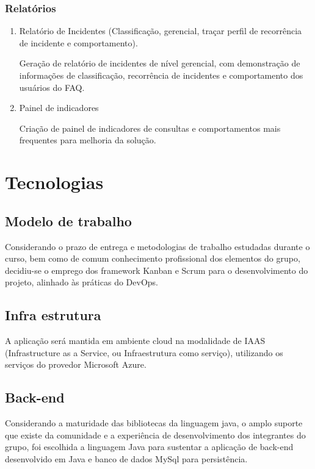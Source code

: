 \documentclass[
    12pt,               %
    openright,          %
    oneside,
    a4paper,            %
    MODELO,             %
    english,            %
    brazil              %
   ]{ifsp-spo-inf-ctds}
\begin{document}
\subsection{Relatórios}

	\begin{enumerate}

	\item Relatório de Incidentes (Classificação, gerencial, traçar perfil de recorrência de incidente e comportamento).
	
	Geração de relatório de incidentes de nível gerencial, com demonstração de informações de classificação, recorrência de incidentes e comportamento dos usuários do FAQ.
	
	\item Painel de indicadores
	
	Criação de painel de indicadores de consultas e comportamentos mais frequentes para melhoria da solução.

	\end{enumerate}
	
\chapter[Tecnologias]{Tecnologias}

\section{Modelo de trabalho}

Considerando o prazo de entrega e metodologias de trabalho estudadas durante o curso, bem como de comum conhecimento profissional dos elementos do grupo, decidiu-se o emprego dos framework Kanban e Scrum para o desenvolvimento do projeto, alinhado {\`a}s práticas do DevOps.


\section{Infra estrutura}

A aplica{\c{c}}ão será mantida em ambiente cloud na modalidade de IAAS (Infrastructure as a Service, ou Infraestrutura como servi{\c{c}}o), utilizando os servi{\c{c}}os do provedor Microsoft Azure.

\section{Back-end}

Considerando a maturidade das bibliotecas da linguagem java, o amplo suporte que existe da comunidade e a experiência de desenvolvimento dos integrantes do grupo, foi escolhida a linguagem Java para sustentar a aplica{\c{c}}ão de back-end desenvolvido em Java e banco de dados MySql para persistência.
\end{document}
